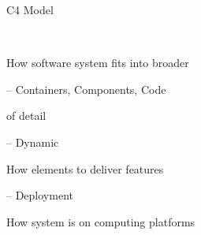 \documentclass{slide}
\begin{document}
\begin{frame}{C4 Model}

\Large{
\begin{description}
    \item<1->[Context] ~~~~
    \begin{itemize}
        \large{\item[$\bullet$] How software system fits into broader }
    \end{itemize}
    \item<2->[Structure] -- Containers, Components, Code
    \begin{itemize}
        \large{\item[$\bullet$]  of detail}
    \end{itemize}
    \item<3->[Behaviour] -- Dynamic
    \begin{itemize}
        \large{\item[$\bullet$] How elements  to deliver features}
    \end{itemize}
    \item<4->[Infrastructure] -- Deployment
    \begin{itemize}
        \large{\item[$\bullet$] How system is  on computing platforms}
    \end{itemize}
\end{description}
}

\end{frame}
\end{document}
